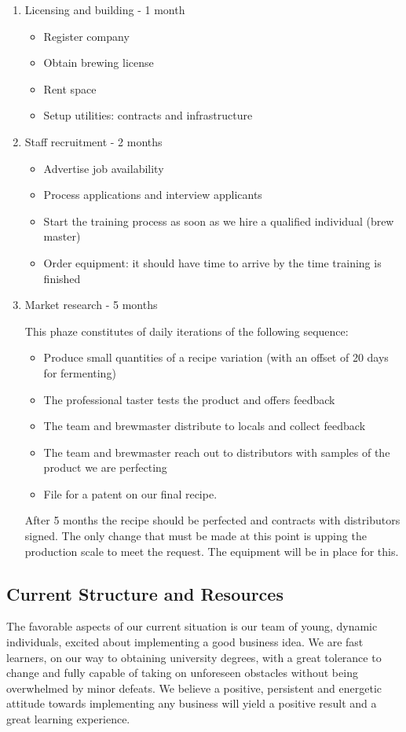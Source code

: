 \documentclass[11pt]{article}
\begin{document}
  \begin{enumerate}
  \item Licensing and building - 1 month
    \begin{itemize}
    \item Register company
    \item Obtain brewing license
    \item Rent space
    \item Setup utilities: contracts and infrastructure
    \end{itemize}

  \item Staff recruitment - 2 months
    \begin{itemize}
    \item Advertise job availability
    \item Process applications and interview applicants
    \item Start the training process as soon as we hire a qualified individual 
(brew master)
    \item Order equipment: it should have time to arrive by the time training 
is finished
    \end{itemize}

  \item Market research - 5 months

This phaze constitutes of daily iterations of the following sequence:
    \begin{itemize}
    \item Produce small quantities of a recipe variation (with an offset of 20 
days for fermenting)
    \item The professional taster tests the product and offers feedback
    \item The team and brewmaster distribute to locals and collect feedback
    \item The team and brewmaster reach out to distributors with samples of the
product we are perfecting
    \item File for a patent on our final recipe.
    \end{itemize}
After 5 months the recipe should be perfected and contracts with distributors
signed. The only change that must be made at this point is upping the production
 scale to meet the request. The equipment will be in place for this.
  \end{enumerate}

  \subsection{Current Structure and Resources}
The favorable aspects of our current situation is our team of young, dynamic
individuals, excited about implementing a good business idea. We are fast
learners, on our way to obtaining university degrees, with a great tolerance
to change and fully capable of taking on unforeseen obstacles without being
overwhelmed by minor defeats. We believe a positive, persistent and energetic
attitude towards implementing any business will yield a positive result and a
great learning experience.
\end{document}
